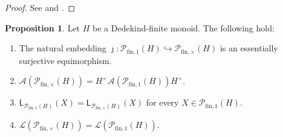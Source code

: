 \documentclass{report}
\renewcommand{\P}{\mathcal{P}}
\newcommand{\funt}{{\textrm{fin}, \times}}
\newcommand{\fun}{{\textrm{fin}, 1}}
\renewcommand{\:}{\text{:}}
\theoremstyle{definition}
\newtheorem{prop}[defn]{Proposition}
\begin{document}
%
\begin{proof}
	See \cite[Theorem 2.22(i)]{fan-tringali18} and \cite[Theorem 3.3(i)]{tringali18}.
\end{proof}
%
\begin{prop}\label{prop:funt&fun-have-the-same-system-of-lengths}
	Let $H$ be a Dedekind-finite monoid. The following hold:
	\begin{enumerate}[label={\rm (\roman{*})}]
		\item\label{it:prop:funt&fun-have-the-same-system-of-lengths(i)} The natural embedding $\jmath: \P_\fun(H)\hookrightarrow \P_\funt(H)$ is an essentially surjective equimorphism.
		\item\label{it:prop:funt&fun-have-the-same-system-of-lengths(ii)} $\mathscr{A}(\mathcal P_{\funt}(H)) = H^\times \mathscr{A}(\mathcal P_{\fun}(H)) H^\times$.
		\item\label{it:prop:funt&fun-have-the-same-system-of-lengths(iii)} $\mathsf{L}_{\mathcal P_{\fun}(H)}(X) = \mathsf{L}_{\mathcal P_{\funt}(H)}(X)$ for every $X \in \mathcal P_{\fun}(H)$.
		\item\label{it:prop:funt&fun-have-the-same-system-of-lengths(iv)} $\mathscr L(\mathcal P_{\funt}(H)) = \mathscr L(\mathcal P_{\fun}(H))$.
	\end{enumerate}
\end{prop}
%
\end{document}
